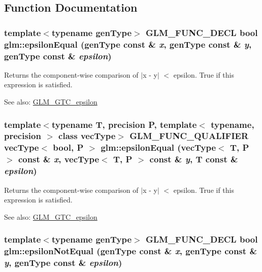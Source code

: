 \subsection{Function Documentation}
\hypertarget{group__gtc__epsilon_g98e0b3362c11f76fc16f5fa9b27435d8}{
\subsubsection[epsilonEqual]{\setlength{\rightskip}{0pt plus 5cm}template$<$typename genType$>$ GLM\_\-FUNC\_\-DECL bool glm::epsilonEqual (genType const \& {\em x}, \/  genType const \& {\em y}, \/  genType const \& {\em epsilon})}}
\label{group__gtc__epsilon_g98e0b3362c11f76fc16f5fa9b27435d8}


Returns the component-wise comparison of $|$x - y$|$ $<$ epsilon. True if this expression is satisfied.

\begin{Desc}
\item[See also:]\hyperlink{group__gtc__epsilon}{GLM\_\-GTC\_\-epsilon} \end{Desc}
\hypertarget{group__gtc__epsilon_g7051ff93341ffb11d864e88d4bc0e3d8}{
\subsubsection[epsilonEqual]{\setlength{\rightskip}{0pt plus 5cm}template$<$typename T, precision P, template$<$ typename, precision $>$ class vecType$>$ GLM\_\-FUNC\_\-QUALIFIER vecType$<$ bool, P $>$ glm::epsilonEqual (vecType$<$ T, P $>$ const \& {\em x}, \/  vecType$<$ T, P $>$ const \& {\em y}, \/  T const \& {\em epsilon})}}
\label{group__gtc__epsilon_g7051ff93341ffb11d864e88d4bc0e3d8}


Returns the component-wise comparison of $|$x - y$|$ $<$ epsilon. True if this expression is satisfied.

\begin{Desc}
\item[See also:]\hyperlink{group__gtc__epsilon}{GLM\_\-GTC\_\-epsilon} \end{Desc}
\hypertarget{group__gtc__epsilon_gcdfcf5e1180e8147b0619c0743e3eb7d}{
\subsubsection[epsilonNotEqual]{\setlength{\rightskip}{0pt plus 5cm}template$<$typename genType$>$ GLM\_\-FUNC\_\-DECL bool glm::epsilonNotEqual (genType const \& {\em x}, \/  genType const \& {\em y}, \/  genType const \& {\em epsilon})}}
\label{group__gtc__epsilon_gcdfcf5e1180e8147b0619c0743e3eb7d}


